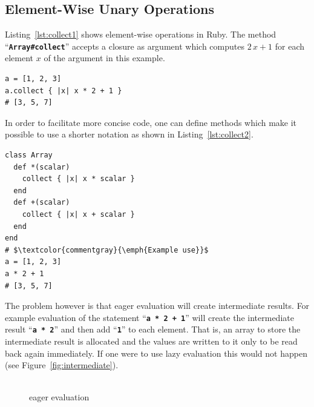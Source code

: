 \documentclass[12pt,a4paper,oneside,openright]{book}
\newcommand{\Eg}{For example }
\newcommand{\Ie}{That is, }
\newcommand{\fig}[1]{Figure~\ref{fig:#1}}
\newcommand{\lst}[1]{Listing~\ref{lst:#1}}
\newcommand{\code}[1]{``\texttt{\textbf{\textcolor{codegray}{\small{#1}}}}''}
\begin{document}
\begin{CJK}{UTF8}{}
\subsection{Element-Wise Unary Operations}\label{cha:unary}
\lst{collect1} shows element-wise operations in Ruby. The method \code{Array\#collect} accepts a closure as argument which computes $2\,x+1$ for each element $x$ of the argument in this example.
\lstset{language=Ruby,frame=single,numbers=none}
\begin{lstlisting}[float=htbp,caption={Element-wise unary operations using \code{Array\#collect}},escapechar=\$,label=lst:collect1]
a = [1, 2, 3]
a.collect { |x| x * 2 + 1 }
# [3, 5, 7]
\end{lstlisting}
In order to facilitate more concise code, one can define methods which make it possible to use a shorter notation as shown in \lst{collect2}.
\lstset{language=Ruby,frame=single,numbers=none}
\begin{lstlisting}[float=htbp,caption={Short notation for element-wise operations},escapechar=\$,label=lst:collect2]
class Array
  def *(scalar)
    collect { |x| x * scalar }
  end
  def +(scalar)
    collect { |x| x + scalar }
  end
end
# $\textcolor{commentgray}{\emph{Example use}}$
a = [1, 2, 3]
a * 2 + 1
# [3, 5, 7]
\end{lstlisting}
The problem however is that eager evaluation will create intermediate results. \Eg evaluation of the statement \code{a * 2 + 1} will create the intermediate result \code{a * 2} and then add \code{1} to each element. \Ie an array to store the intermediate result is allocated and the values are written to it only to be read back again immediately. If one were to use lazy evaluation this would not happen (see \fig{intermediate}).
\begin{figure}[htbp]
   \begin{center}
     \begin{minipage}[t]{.336940298507463\textwidth} %
       \begin{center}
         \\
         eager evaluation
       \end{center}

\end{minipage}
\end{center}
\end{figure}
\end{CJK}
\end{document}
